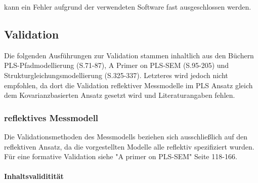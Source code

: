 \documentclass{article}\usepackage[]{graphicx}\usepackage[]{color}
\begin{document}
kann ein Fehler aufgrund der verwendeten Software fast ausgeschlossen werden.

\newpage

\subsection{Validation}
Die folgenden Ausführungen zur Validation stammen inhaltlich aus den Büchern PLS-Pfadmodellierung (S.71-87)\cite{bliemel2005handbuch}, A Primer on PLS-SEM (S.95-205)\cite{hair2013primer} und Strukturgleichungsmodellierung (S.325-337).\cite{weiber2010strukturgleichungsmodellierung} Letzteres wird jedoch nicht empfohlen, da dort die Validation reflektiver Messmodelle im PLS Ansatz gleich dem Kovarianzbasierten Ansatz gesetzt wird und Literaturangaben fehlen.
\subsubsection{reflektives Messmodell}
Die Validationsmethoden des Messmodells beziehen sich ausschließlich auf den reflektiven Ansatz, da die vorgestellten Modelle alle reflektiv spezifiziert wurden. Für eine formative Validation siehe "A primer on PLS-SEM"\cite{hair2013primer} Seite 118-166.\\

\paragraph{Inhaltsvaliditität} 
\end{document}
